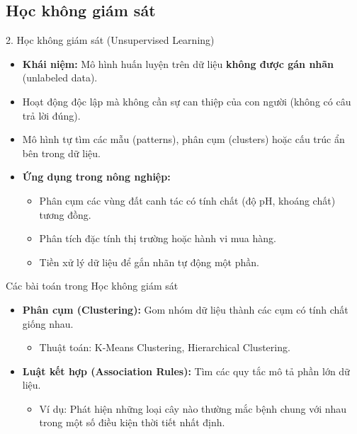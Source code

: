 \documentclass[aspectratio=169]{beamer}
\begin{document}
\subsection{Học không giám sát}
\begin{frame}{2. Học không giám sát (Unsupervised Learning)}
    \begin{itemize}
        \item \textbf{Khái niệm:} Mô hình huấn luyện trên dữ liệu \textbf{không được gán nhãn} (unlabeled data).
        \item Hoạt động độc lập mà không cần sự can thiệp của con người (không có câu trả lời đúng).
        \item Mô hình tự tìm các mẫu (patterns), phân cụm (clusters) hoặc cấu trúc ẩn bên trong dữ liệu.
        \item \textbf{Ứng dụng trong nông nghiệp:}
        \begin{itemize}
            \item Phân cụm các vùng đất canh tác có tính chất (độ pH, khoáng chất) tương đồng.
            \item Phân tích đặc tính thị trường hoặc hành vi mua hàng.
            \item Tiền xử lý dữ liệu để gắn nhãn tự động một phần.
        \end{itemize}
    \end{itemize}
\end{frame}

\begin{frame}{Các bài toán trong Học không giám sát}
    \begin{itemize}
        \item \textbf{Phân cụm (Clustering):} Gom nhóm dữ liệu thành các cụm có tính chất giống nhau. 
        \begin{itemize}
            \item Thuật toán: K-Means Clustering, Hierarchical Clustering.
        \end{itemize}
        \item \textbf{Luật kết hợp (Association Rules):} Tìm các quy tắc mô tả phần lớn dữ liệu.
        \begin{itemize}
            \item Ví dụ: Phát hiện những loại cây nào thường mắc bệnh chung với nhau trong một số điều kiện thời tiết nhất định.
        \end{itemize}
    \end{itemize}
\end{frame}
\end{document}
